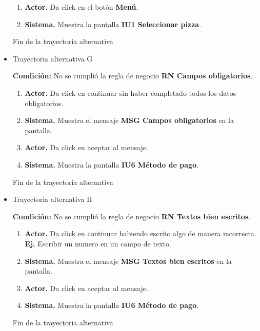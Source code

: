 \begin{itemize}
	\begin{enumerate}
		\item \textbf{Actor.} Da click en el botón \textbf{Menú}.
		\item \textbf{Sistema.} Muestra la pantalla \textbf{IU1 Seleccionar pizza}.
	\end{enumerate}
	
	Fin de la trayectoria alternativa
	
	\item \hypertarget{TAG:CU4}{Trayectoria alternativa G}
	
		\noindent \textbf{Condición:} No se cumplió la regla de negocio \textbf{RN Campos obligatorios}.
	
	\begin{enumerate}
		\item \textbf{Actor.} Da click en continuar sin haber completado todos los datos obligatorios.
		\item \textbf{Sistema.} Muestra el mensaje \textbf{MSG Campos obligatorios} en la pantalla.
		\item \textbf{Actor.} Da click en aceptar al mensaje.
		\item \textbf{Sistema.} Muestra la pantalla \textbf{IU6 Método de pago}.
	\end{enumerate}
	
	Fin de la trayectoria alternativa
	
		\item \hypertarget{TAH:CU4}{Trayectoria alternativa H}
	
	\noindent \textbf{Condición:} No se cumplió la regla de negocio \textbf{RN Textos bien escritos}.
	
	\begin{enumerate}
		\item \textbf{Actor.} Da click en continuar habiendo escrito algo de manera incorrecta.
		\\\textbf{Ej.} Escribir un numero en un campo de texto.
		\item \textbf{Sistema.} Muestra el mensaje \textbf{MSG Textos bien escritos} en la pantalla.
		\item \textbf{Actor.} Da click en aceptar al mensaje.
		\item \textbf{Sistema.} Muestra la pantalla \textbf{IU6 Método de pago}.
	\end{enumerate}
	
	Fin de la trayectoria alternativa
	
\end{itemize}